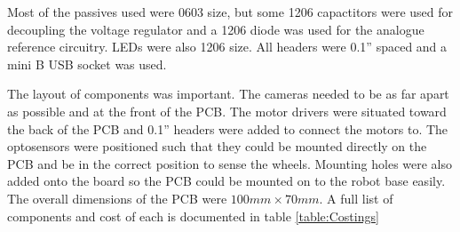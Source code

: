 Most of the passives used were 0603 size, but some 1206 capactitors were used for decoupling the voltage regulator and a 1206 diode was used for the analogue reference circuitry. LEDs were also 1206 size. All headers were 0.1'' spaced and a mini B USB socket was used. 

The layout of components was important. The cameras needed to be as far apart as possible and at the front of the PCB. The motor drivers were situated toward the back of the PCB and 0.1'' headers were added to connect the motors to. The optosensors were positioned such that they could be mounted directly on the PCB and be in the correct position to sense the wheels. Mounting holes were also added onto the board so the PCB could be mounted on to the robot base easily. The overall dimensions of the PCB were $100mm \times 70mm$. A full list of components and cost of each is documented in table \ref{table:Costings}


